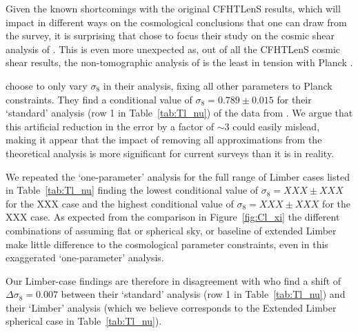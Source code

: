 Given the known shortcomings with the original CFHTLenS results, which will impact in different ways on the cosmological conclusions that one can draw from the survey, it is surprising that \citet{kitching/etal:2016} chose to focus their study on the cosmic shear analysis of \citet{kilbinger/etal:2013}.  This is even more unexpected as, out of all the CFHTLenS cosmic shear results, the non-tomographic analysis of \citet{kilbinger/etal:2013} is the least in tension with Planck \citep[see for example][who show that with $\sigma_8 (\Omega_m/0.3)^{0.5} = 0.738^{+0.055}_{-0.032}$, \citet{kilbinger/etal:2013} is in agreement with Planck at $1.6 \sigma$]{abbott/etal:2016}.

\citet{kitching/etal:2016} choose to only vary $\sigma_8$ in their analysis, fixing all other parameters to Planck constraints.  They find a conditional value of $\sigma_8 = 0.789 \pm 0.015$ for their `standard' analysis (row 1 in Table~\ref{tab:Tl_nu}) of the data from \citet{kilbinger/etal:2013}.    We argue that this artificial reduction in the error by a factor of $\sim 3$ could easily mislead, making it appear that the impact of removing all approximations from the theoretical analysis is more significant for current surveys than it is in reality.

We repeated the `one-parameter' analysis for the full range of Limber cases listed in Table~\ref{tab:Tl_nu} finding the lowest conditional value of $\sigma_8 = XXX \pm XXX$ for the XXX case and the highest conditional value of $\sigma_8 = XXX \pm XXX$ for the XXX case.  As expected from the comparison in Figure~\ref{fig:Cl_xi} the different combinations of assuming flat or spherical sky, or baseline of extended Limber make little difference to the cosmological parameter constraints, even in this exaggerated `one-parameter' analysis.  

Our Limber-case findings are therefore in disagreement with \citet{kitching/etal:2016} who find a shift of $\Delta \sigma_8 = 0.007$ between their `standard' analysis (row 1 in Table~\ref{tab:Tl_nu}) and their `Limber' analysis (which we believe corresponds to the Extended Limber spherical case in Table~\ref{tab:Tl_nu}).


